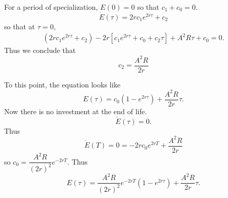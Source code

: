 \documentclass[12pt,compress,handout]{beamer}  %
\begin{document}
\begin{frame}

For a period of specialization, $E(0)=0$ so that $c_{1}+c_{0}=0$.
\begin{equation*}
    \dot{E}(\tau ) = 2rc_{1}e^{2r\tau }+c_{2}
\end{equation*}
so that at $\tau =0$,{\footnotesize
\begin{gather*}
    (2r c_{1} e^{2r\tau }+c_{2})
    - 2r[c_{1}e^{2r\tau }+c_{0}+c_{2}\tau ]+A^{2}R\tau +c_{0}=0\text{.}
\end{gather*}
} Thus we conclude that {\footnotesize
\begin{equation*}
c_2 = \frac{A^2R}{2r}
\end{equation*}
}

\end{frame}


\begin{frame}

To this point, the equation looks like
\begin{equation*}
    E(\tau )=c_{0}(1-e^{2r\tau })+\dfrac{A^{2}R}{2r}\tau.
\end{equation*}
Now there is no investment at the end of life.
\begin{equation*}
    \dot{E}(\tau )=0.
\end{equation*}
Thus
\begin{equation*}
    \dot{E}(T)=0=-2rc_{0}e^{2rT}+\dfrac{A^{2}R}{2r}
\end{equation*}
so $c_{0}=\dfrac{A^{2}R}{(2r)^{2}}e^{-2rT}$. Thus
\begin{equation*}
    E(\tau )=\dfrac{A^{2}R}{(2r)^{2}}e^{-2rT}(1-e^{2r\tau })
        +\dfrac{A^{2}R}{2r}\tau.
\end{equation*}

\end{frame}
\end{document}

